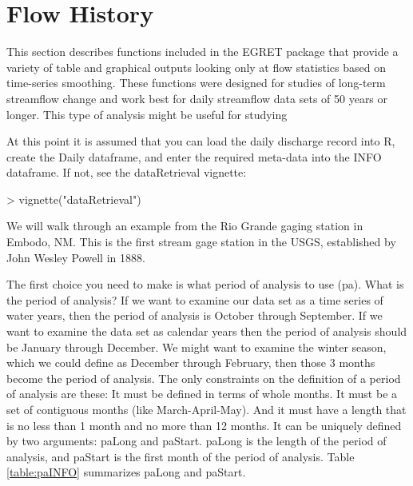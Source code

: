 \documentclass[a4paper,11pt]{article}
\begin{document}
\section{Flow History}
\label{sec:flowHistory}
This section describes functions included in the EGRET package that provide a variety of table and graphical outputs looking only at flow statistics based on time-series smoothing. These functions were designed for studies of long-term streamflow change and work best for daily streamflow data sets of 50 years or longer. This type of analysis might be useful for studying 

At this point it is assumed that you can load the daily discharge record into R, create the Daily dataframe, and enter the required meta-data into the INFO dataframe. If not, see the dataRetrieval vignette:

\begin{Schunk}
\begin{Sinput}
> vignette("dataRetrieval")
\end{Sinput}
\end{Schunk}

We will walk through an example from the Rio Grande gaging station in Embodo, NM.  This is the first stream gage station in the USGS, established by John Wesley Powell in 1888.


\begin{Schunk}
\end{Schunk}

The first choice you need to make is what period of analysis to use (pa). What is the period of analysis?  If we want to examine our data set as a time series of water years, then the period of analysis is October through September.  If we want to examine the data set as calendar years then the period of analysis should be January through December.  We might want to examine the winter season, which we could define as December through February, then those 3 months become the period of analysis. The only constraints on the definition of a period of analysis are these: It must be defined in terms of whole months.  It must be a set of contiguous months (like March-April-May).  And it must have a length that is no less than 1 month and no more than 12 months.  It can be uniquely defined by two arguments: paLong and paStart.  paLong is the length of the period of analysis, and paStart is the first month of the period of analysis. Table \ref{table:paINFO} summarizes paLong and paStart.
\end{document}

